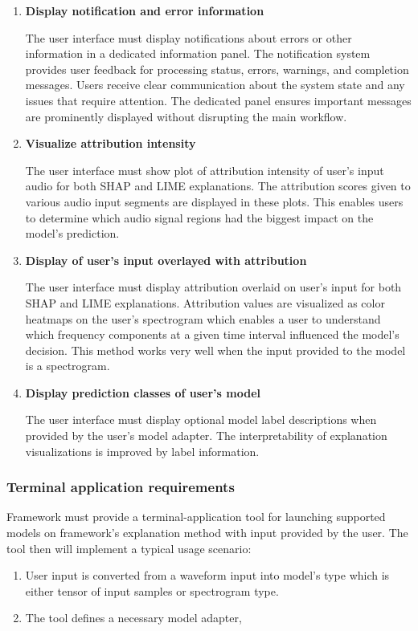 \documentclass[
    bindingoffset=5mm,  %
    footnoteindent=3mm, %
    hyphenation=true    %
]{src/wut-thesis}
\begin{document}
\begin{enumerate}[itemsep=1\baselineskip]
    \item \textbf{Display notification and error information}

        The user interface must display notifications about errors or other information in a dedicated information
    panel. The notification system provides user feedback for processing status, errors, warnings,
    and completion messages. Users receive clear communication about the system state and any issues that
    require attention. The dedicated panel ensures important messages are prominently displayed without
    disrupting the main workflow.

    \item \textbf{Visualize attribution intensity}

        The user interface must show plot of attribution intensity of user's input audio
    for both SHAP and LIME explanations. The attribution scores given to various audio input segments are displayed in these plots. This enables users to determine which audio signal regions had the biggest impact on the model's prediction.

    \item \textbf{Display of user's input overlayed with attribution}

        The user interface must display attribution overlaid on user's input for both SHAP and LIME explanations.
    Attribution values are visualized as color heatmaps on the user's spectrogram which enables a user to
    understand which frequency components at a given time interval influenced the model's decision.
    This method works very well when the input provided to the model is a spectrogram.

    \item \textbf{Display prediction classes of user's model}

        The user interface must display optional model label descriptions when provided by the user's model adapter.
    The interpretability of explanation visualizations is improved by label information.

    \end{enumerate}

\subsubsection{Terminal application requirements}
    Framework must provide a terminal-application tool for launching supported models on framework's explanation method with input provided by the user. The tool then will implement a typical usage scenario:
    \begin{enumerate}
        \item User input is converted from a waveform input into model's type which is either tensor of input samples or spectrogram type.
        \item The tool defines a necessary model adapter,
    \end{enumerate}
\end{document}
